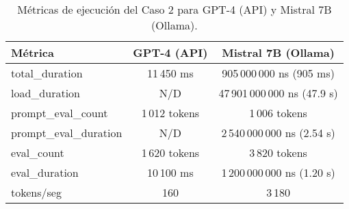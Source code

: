 
\begin{table}[h!]
\centering
\begin{tabular}{|l|c|c|}
\hline
\textbf{Métrica} & \textbf{GPT-4 (API)} & \textbf{Mistral 7B (Ollama)} \\
\hline
total\_duration & 11\,450 ms & 905\,000\,000 ns (905 ms) \\
load\_duration & N/D & 47\,901\,000\,000 ns (47.9 s) \\
prompt\_eval\_count & 1\,012 tokens & 1\,006 tokens \\
prompt\_eval\_duration & N/D & 2\,540\,000\,000 ns (2.54 s) \\
eval\_count & 1\,620 tokens & 3\,820 tokens \\
eval\_duration & 10\,100 ms & 1\,200\,000\,000 ns (1.20 s) \\
tokens/seg & 160 & 3\,180 \\
\hline
\end{tabular}
\caption{Métricas de ejecución del Caso 2 para GPT-4 (API) y Mistral 7B (Ollama).}
\end{table}
